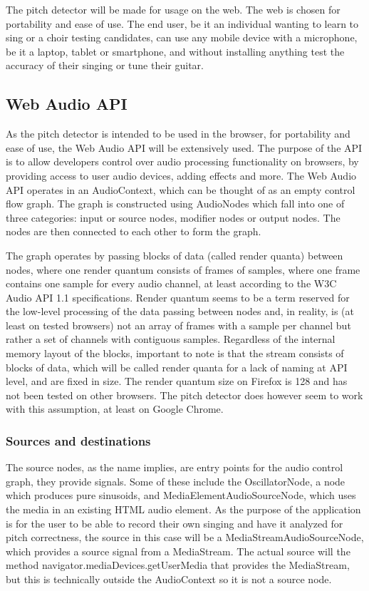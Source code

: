 The pitch detector will be made for usage on the web. The web is chosen for portability and ease of use. The end user, be it an individual wanting to learn to sing or a choir testing candidates, can use any mobile device with a microphone, be it a laptop, tablet or smartphone, and without installing anything test the accuracy of their singing or tune their guitar.

\subsection{Web Audio API}
As the pitch detector is intended to be used in the browser, for portability and ease of use, the Web Audio API will be extensively used. The purpose of the API is to allow developers control over audio processing functionality on browsers, by providing access to user audio devices, adding effects and more. 
The Web Audio API operates in an AudioContext, which can be thought of as an empty control flow graph. The graph is constructed using AudioNodes which fall into one of three categories: input or source nodes, modifier nodes or output nodes. The nodes are then connected to each other to form the graph. 

The graph operates by passing blocks of data (called render quanta) between nodes, where one render quantum consists of frames of samples, where one frame contains one sample for every audio channel, at least according to the W3C Audio API 1.1 specifications. Render quantum seems to be a term reserved for the low-level processing of the data passing between nodes and, in reality, is (at least on tested browsers) not an array of frames with a sample per channel but rather a set of channels with contiguous samples. Regardless of the internal memory layout of the blocks, important to note is that the stream consists of blocks of data, which will be called render quanta for a lack of naming at API level, and are fixed in size. The render quantum size on Firefox is 128 and has not been tested on other browsers. The pitch detector does however seem to work with this assumption, at least on Google Chrome.


\subsubsection{Sources and destinations}
The source nodes, as the name implies, are entry points for the audio control graph, they provide signals. Some of these include the OscillatorNode, a node which produces pure sinusoids, and MediaElementAudioSourceNode, which uses the media in an existing HTML audio element. As the purpose of the application is for the user to be able to record their own singing and have it analyzed for pitch correctness, the source in this case will be a MediaStreamAudioSourceNode, which provides a source signal from a MediaStream. The actual source will the method navigator.mediaDevices.getUserMedia\(\) that provides the MediaStream, but this is technically outside the AudioContext so it is not a source node.


